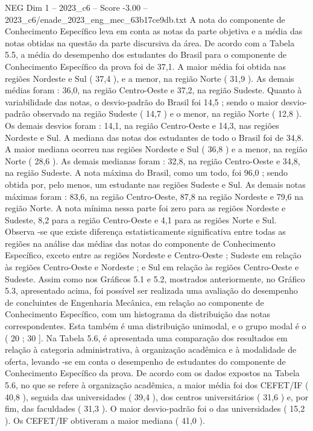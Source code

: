 \begin{textsample}{NEG Dim 1 – 2023\_c6 – Score -3.00 – 2023\_c6/enade\_2023\_eng\_mec\_63b17ce9db.txt}
A nota do componente de Conhecimento Específico leva em conta as notas da parte objetiva e a média das notas obtidas na questão da parte discursiva da área.
De acordo com a Tabela 5.5, a média do desempenho dos estudantes do Brasil para o componente de Conhecimento Específico da prova foi de 37,1.
A maior média foi obtida nas regiões Nordeste e Sul ( 37,4 ), e a menor, na região Norte ( 31,9 ).
As demais médias foram : 36,0, na região Centro-Oeste e 37,2, na região Sudeste.
Quanto à variabilidade das notas, o desvio-padrão do Brasil foi 14,5 ; sendo o maior desvio-padrão observado na região Sudeste ( 14,7 ) e o menor, na região Norte ( 12,8 ).
Os demais desvios foram : 14,1, na região Centro-Oeste e 14,3, nas regiões Nordeste e Sul.
A mediana das notas dos estudantes de todo o Brasil foi de 34,8.
A maior mediana ocorreu nas regiões Nordeste e Sul ( 36,8 ) e a menor, na região Norte ( 28,6 ).
As demais medianas foram : 32,8, na região Centro-Oeste e 34,8, na região Sudeste.
A nota máxima do Brasil, como um todo, foi 96,0 ; sendo obtida por, pelo menos, um estudante nas regiões Sudeste e Sul.
As demais notas máximas foram : 83,6, na região Centro-Oeste, 87,8 na região Nordeste e 79,6 na região Norte.
A nota mínima nessa parte foi zero para as regiões Nordeste e Sudeste, 8,2 para a região Centro-Oeste e 4,1 para as regiões Norte e Sul.
Observa -se que existe diferença estatisticamente significativa entre todas as regiões na análise das médias das notas do componente de Conhecimento Específico, exceto entre as regiões Nordeste e Centro-Oeste ; Sudeste em relação às regiões Centro-Oeste e Nordeste ; e Sul em relação às regiões Centro-Oeste e Sudeste.
Assim como nos Gráficos 5.1 e 5.2, mostrados anteriormente, no Gráfico 5.3, apresentado acima, foi possível ser realizada uma avaliação do desempenho de concluintes de Engenharia Mecânica, em relação ao componente de Conhecimento Específico, com um histograma da distribuição das notas correspondentes.
Esta também é uma distribuição unimodal, e o grupo modal é o ( 20 ; 30 ].
Na Tabela 5.6, é apresentada uma comparação dos resultados em relação à categoria administrativa, à organização acadêmica e à modalidade de oferta, levando -se em conta o desempenho de estudantes do componente de Conhecimento Específico da prova.
De acordo com os dados expostos na Tabela 5.6, no que se refere à organização acadêmica, a maior média foi dos CEFET/IF ( 40,8 ), seguida das universidades ( 39,4 ), dos centros universitários ( 31,6 ) e, por fim, das faculdades ( 31,3 ).
O maior desvio-padrão foi o das universidades ( 15,2 ).
Os CEFET/IF obtiveram a maior mediana ( 41,0 ).

\end{textsample}
